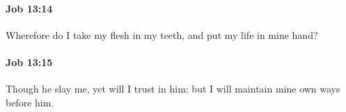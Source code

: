 		\paragraph{Job 13:14} %
			\label{JOB-13-14}

			Wherefore do I take my flesh in my teeth, and put my life in mine hand?


		\paragraph{Job 13:15} %
			\label{JOB-13-15}

			Though he slay me, yet will I trust in him: but I will maintain mine own ways before him.



